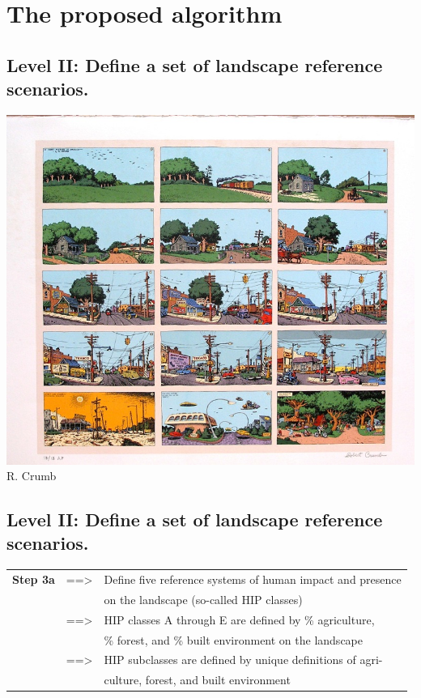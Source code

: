 \documentclass[
paper=128mm:96mm, %
fontsize=11pt, %
pagesize, %
parskip=half-, %
]{scrartcl} %
\theoremstyle{mythmstyle} %
\begin{document}
\clearpage
\section{The proposed algorithm}
\subsection{Level II: Define a set of landscape reference scenarios.}
\includegraphics[height=5 cm]{Image13.jpg}
\footnotesize R. Crumb

\clearpage
\subsection{Level II: Define a set of landscape reference scenarios.}
\begin{tabular}{lll}
\textbf{Step 3a} & ==> &Define five reference systems of human impact and presence\\
& &on the landscape (so-called HIP classes)\\
& ==> & HIP classes A through E are defined by \% agriculture, \\
& &\% forest, and \% built environment on the landscape\\
& ==> & HIP subclasses are defined by unique definitions of agri-\\
& & culture, forest, and built environment
\end{tabular} 

\clearpage
\end{document}
